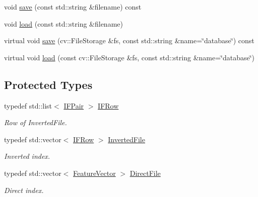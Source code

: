 \begin{DoxyCompactItemize}
\item 
void \hyperlink{classDBoW2_1_1TemplatedDatabase_a7162dee10a5602c309729900bff52ead}{save} (const std\+::string \&filename) const
\item 
void \hyperlink{classDBoW2_1_1TemplatedDatabase_aff1528af5cff047539eb1e2c75fb6345}{load} (const std\+::string \&filename)
\item 
virtual void \hyperlink{classDBoW2_1_1TemplatedDatabase_a69b77a060880f10e11d86d1f665cfd24}{save} (cv\+::\+File\+Storage \&fs, const std\+::string \&name=\char`\"{}database\char`\"{}) const
\item 
virtual void \hyperlink{classDBoW2_1_1TemplatedDatabase_a9aef0b11da757aba5f07deb2f5b66097}{load} (const cv\+::\+File\+Storage \&fs, const std\+::string \&name=\char`\"{}database\char`\"{})
\end{DoxyCompactItemize}
\subsection*{Protected Types}
\begin{DoxyCompactItemize}
\item 
\mbox{\label{classDBoW2_1_1TemplatedDatabase_ae1837c4f89c6c55b460b761f8b79b568}} 
typedef std\+::list$<$ \hyperlink{structDBoW2_1_1TemplatedDatabase_1_1IFPair}{I\+F\+Pair} $>$ \hyperlink{classDBoW2_1_1TemplatedDatabase_ae1837c4f89c6c55b460b761f8b79b568}{I\+F\+Row}
\begin{DoxyCompactList}\small\item\em Row of Inverted\+File. \end{DoxyCompactList}\item 
\mbox{\label{classDBoW2_1_1TemplatedDatabase_ad16f54a326cfb827de3af1d979c52768}} 
typedef std\+::vector$<$ \hyperlink{classDBoW2_1_1TemplatedDatabase_ae1837c4f89c6c55b460b761f8b79b568}{I\+F\+Row} $>$ \hyperlink{classDBoW2_1_1TemplatedDatabase_ad16f54a326cfb827de3af1d979c52768}{Inverted\+File}
\begin{DoxyCompactList}\small\item\em Inverted index. \end{DoxyCompactList}\item 
\mbox{\label{classDBoW2_1_1TemplatedDatabase_aa74effa19eeb016d54e256861938aac9}} 
typedef std\+::vector$<$ \hyperlink{classDBoW2_1_1FeatureVector}{Feature\+Vector} $>$ \hyperlink{classDBoW2_1_1TemplatedDatabase_aa74effa19eeb016d54e256861938aac9}{Direct\+File}
\begin{DoxyCompactList}\small\item\em Direct index. \end{DoxyCompactList}\end{DoxyCompactItemize}
